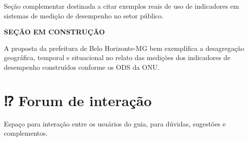 \documentclass[
  letterpaper,
  DIV=11,
  numbers=noendperiod]{scrreprt}
\begin{document}

{Seção complementar destinada a citar exemplos reais de uso de
indicadores em sistemas de medição de desempenho no setor público.}

\textbf{SEÇÃO EM CONSTRUÇÃO}

A proposta da prefeitura de Belo Horizonte-MG bem exemplifica a
desagregação geográfica, temporal e situacional no relato das medições
dos indicadores de desempenho construídos conforme os ODS da ONU.


\hypertarget{forum-de-interauxe7uxe3o}{%
\chapter*{⁉️ Forum de interação}\label{forum-de-interauxe7uxe3o}}


{Espaço para interação entre os usuários do guia, para dúvidas,
sugestões e complementos.}
\end{document}
